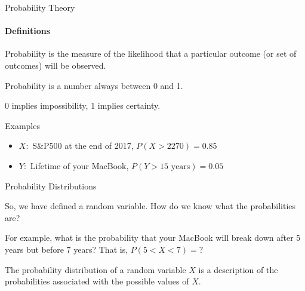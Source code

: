 \documentclass{beamer}\usepackage[]{graphicx}\usepackage[]{color}
\begin{document}
\begin{darkframes}
	
	
	\begin{frame}[label=lists]{Probability Theory}
		\framesubtitle{Definitions}    
		
      	\begin{definition}
       		\alert{Probability} is the measure of the likelihood that a particular outcome (or set of outcomes) will be observed. \newline \pause
       		
       		Probability is a number always between 0 and 1. \newline \pause
       		
       		0 implies impossibility, 1 implies certainty.
      	\end{definition} \pause
    
    
    	\begin{exampleblock}{Examples}
      		\begin{itemize}

				\item $X:$ S\&P500 at the end of 2017, $P(X>2270) = 0.85$  \pause %
				\item $Y:$ Lifetime of your MacBook, $ P(Y>15\text{ years})  = 0.05$

			\end{itemize}
        \end{exampleblock}
  
	\end{frame}  	
	
	
  
  
  
  
  
	\begin{frame}[label=lists]{Probability Distributions}
	
		So, we have defined a random variable. How do we know what the probabilities are? \newline \pause
		
		For example, what is the probability that your MacBook will break down after 5 years but before 7 years? That is, $P(5<X<7)=?$\newline \pause
  
		
      	\begin{definition}
       		The \alert{probability distribution} of a random variable $X$ is a description of the probabilities associated with the possible values of $X$. 
			\newline       \pause 		
       		

\end{definition}
\end{frame}
\end{darkframes}
\end{document}
